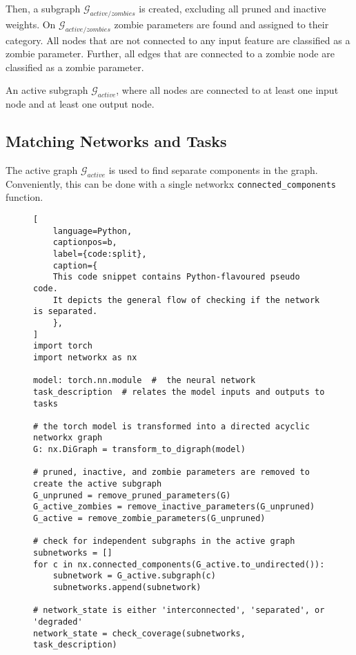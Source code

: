 Then, a subgraph $\mathcal{G}_{active/zombies}$ is created, excluding all pruned and inactive weights.
On $\mathcal{G}_{active/zombies}$ zombie parameters are found and assigned to their category. 
All nodes that are not connected to any input feature are classified as a zombie parameter. 
Further, all edges that are connected to a zombie node are classified as a zombie parameter.

An active subgraph $\mathcal{G}_{active}$, where all nodes are connected to at least one input node and at least one output node.

\subsection{Matching Networks and Tasks}\label{sec:taskmatch}
The active graph $\mathcal{G}_{active}$ is used to find separate components in the graph.
Conveniently, this can be done with a single networkx \lstinline{connected_components} function.

\begin{figure}[ht]
\centering
\begin{minipage}{\linewidth}
\begin{lstlisting}[
    language=Python,
    captionpos=b, 
    label={code:split},
    caption={
    This code snippet contains Python-flavoured pseudo code.
    It depicts the general flow of checking if the network is separated.
    },
]
import torch
import networkx as nx

model: torch.nn.module  #  the neural network
task_description  # relates the model inputs and outputs to tasks

# the torch model is transformed into a directed acyclic networkx graph
G: nx.DiGraph = transform_to_digraph(model)

# pruned, inactive, and zombie parameters are removed to create the active subgraph
G_unpruned = remove_pruned_parameters(G)
G_active_zombies = remove_inactive_parameters(G_unpruned)
G_active = remove_zombie_parameters(G_unpruned)

# check for independent subgraphs in the active graph
subnetworks = []
for c in nx.connected_components(G_active.to_undirected()):
    subnetwork = G_active.subgraph(c)
    subnetworks.append(subnetwork)

# network_state is either 'interconnected', 'separated', or 'degraded'
network_state = check_coverage(subnetworks, task_description)
\end{lstlisting}
\end{minipage}
\end{figure}

